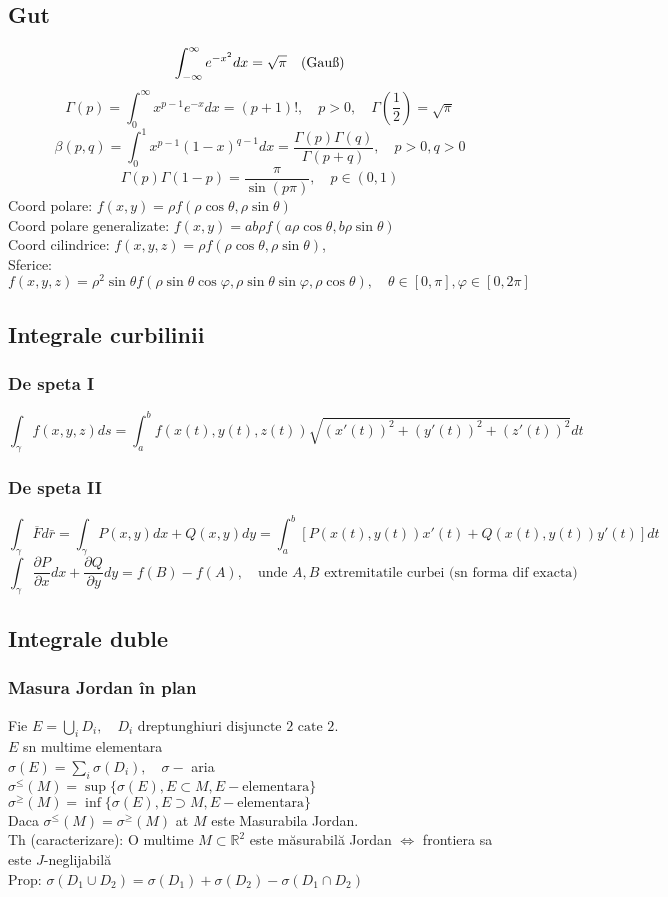 \documentclass{article}
\newcommand{\parti}[2]{\frac{\partial #1}{ \partial #2}}
\newcommand*{\R}{\mathbb{R}}
\begin{document}
\subsection*{Gut}
\[ \int_{-\infty}^{\infty}e^{-x^2}dx = \sqrt{\pi} \text{\quad(Gauß)} \]
\[ \Gamma(p) = \int_0^{\infty} x^{p-1}e^{-x}dx = (p+1)!, \quad p > 0, \quad \Gamma\left(\frac{1}{2}\right) = \sqrt{\pi}  \]
\[ \beta(p, q) = \int_0^{1} x^{p-1}(1-x)^{q-1}dx = \frac{\Gamma(p)\Gamma(q)}{\Gamma(p+q)}, \quad p > 0, q > 0 \]
\[ \Gamma(p)\Gamma(1-p)= \frac{\pi}{\sin(p\pi)}, \quad p \in (0, 1) \]
Coord polare: $f(x,y) = \rho f(\rho \cos \theta, \rho \sin\theta)$ \\
Coord polare generalizate: $f(x,y) = ab\rho f(a\rho\cos\theta, b\rho\sin\theta) $\\
Coord cilindrice: $f(x, y, z) = \rho f(\rho\cos\theta, \rho\sin\theta)$, \\
Sferice: $f(x, y,z) = \rho^2\sin\theta f(\rho \sin\theta\cos\varphi, \rho\sin\theta\sin\varphi, \rho\cos\theta),\quad \theta \in [0, \pi], \varphi \in[0, 2\pi]$
\subsection*{Integrale curbilinii}
\subsubsection*{De speta I}
\[ \int_{\gamma} f(x, y, z)ds = \int_a^bf(x(t), y(t), z(t)) \sqrt{(x'(t))^2+(y'(t))^2+(z'(t))^2} dt \]
\subsubsection*{De speta II}
\[ \int_{\gamma}\overline{F}d\bar{r} = \int_{\gamma} P(x,y) dx+ Q(x,y)dy = \int_a^b \left[P(x(t), y(t))x'(t) + Q(x(t), y(t)) y'(t) \right]dt \]
\[ \int_{\gamma} \parti{P}{x}dx+\parti{Q}{y}dy = f(B)- f(A), \quad \text{unde $A, B$ extremitatile curbei (sn forma dif exacta) } \]
\subsection*{Integrale duble}
\subsubsection*{Masura Jordan în plan}
Fie $E = \bigcup_i D_i, \quad D_i \text{ dreptunghiuri disjuncte 2 cate 2}$.\\
$E$ sn multime elementara\\
$\sigma(E) = \sum_i \sigma(D_i), \quad \sigma - $ aria\\
$\sigma^{\le}(M)=\sup\{\sigma(E), E \subset M, E -\text{elementara} \}$\\
$\sigma^{\ge}(M)=\inf\{\sigma(E), E \supset M, E -\text{elementara} \}$\\
Daca $\sigma^{\le}(M)=\sigma^{\ge}(M) $ at $M$ este Masurabila Jordan.\\
Th (caracterizare): O multime $M \subset \R^2$ este măsurabilă Jordan $\iff$ frontiera sa este $J$-neglijabilă\\
Prop: $\sigma(D_1\cup D_2) = \sigma(D_1) + \sigma(D_2) - \sigma(D_1\cap D_2)$
\end{document}
